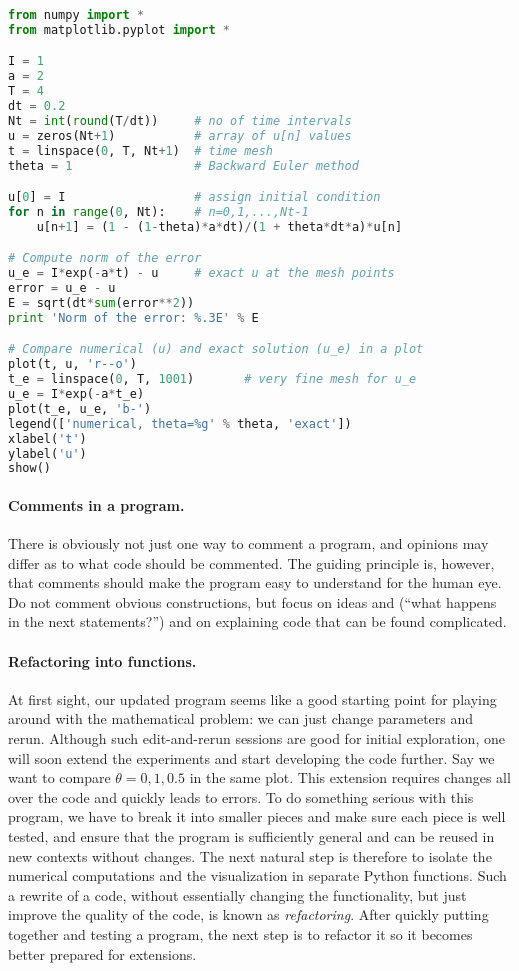 \documentclass[graybox,sectrefs,envcountresetchap,open=right,final]{svmonodo}
\begin{document}
\begin{lstlisting}[language=python,style=blue1bar_bluegreen]
from numpy import *
from matplotlib.pyplot import *

I = 1
a = 2
T = 4
dt = 0.2
Nt = int(round(T/dt))     # no of time intervals
u = zeros(Nt+1)           # array of u[n] values
t = linspace(0, T, Nt+1)  # time mesh
theta = 1                 # Backward Euler method

u[0] = I                  # assign initial condition
for n in range(0, Nt):    # n=0,1,...,Nt-1
    u[n+1] = (1 - (1-theta)*a*dt)/(1 + theta*dt*a)*u[n]

# Compute norm of the error
u_e = I*exp(-a*t) - u     # exact u at the mesh points
error = u_e - u
E = sqrt(dt*sum(error**2))
print 'Norm of the error: %.3E' % E

# Compare numerical (u) and exact solution (u_e) in a plot
plot(t, u, 'r--o')
t_e = linspace(0, T, 1001)       # very fine mesh for u_e
u_e = I*exp(-a*t_e)
plot(t_e, u_e, 'b-')
legend(['numerical, theta=%g' % theta, 'exact'])
xlabel('t')
ylabel('u')
show()

\end{lstlisting}


\paragraph{Comments in a program.}
There is obviously not just one way to comment a program, and opinions
may differ as to what code should be commented.
The guiding principle is, however, that comments should make the
program easy to understand for the human eye. Do not comment obvious
constructions, but focus on ideas and (``what happens in the next
statements?'') and on explaining code that can be found
complicated.


\paragraph{Refactoring into functions.}
At first sight, our updated program seems like
a good starting point for playing around
with the mathematical problem: we can just change parameters and rerun.
Although such edit-and-rerun sessions are good for initial exploration,
one will soon extend the experiments and start developing the code
further. Say we want to compare $\theta =0,1,0.5$ in the same
plot. This extension requires changes all over the code and quickly
leads to errors. To do something serious with this program, we have to
break it into smaller pieces and make sure each piece is well tested,
and ensure that the program is sufficiently general and can be reused in
new contexts without changes.  The
next natural step is therefore to isolate the numerical computations
and the visualization in separate Python functions.
Such a rewrite of a code, without essentially changing the functionality,
but just improve the quality of the code, is known as \emph{refactoring}.
After quickly putting together and testing a program, the next
step is to refactor it so it becomes better prepared for extensions.
\end{document}
